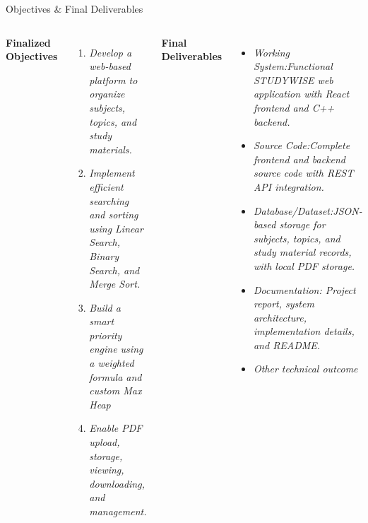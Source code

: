 \documentclass[aspectratio=169,11pt]{beamer}
\newcommand{\placeholder}[1]{%
\textit{\color{GEUGrey}#1}
}
\begin{document}
\vspace{-2cm}
\begin{frame}{Objectives \& Final Deliverables}

\begin{columns}[T,totalwidth=\textwidth]

\vspace{-0.8cm}
\textbf{\color{GEUBlue}Finalized Objectives}

\begin{enumerate}\itemsep3pt
    \item \placeholder{Develop a web-based platform to organize subjects, topics, and study materials.}
    \item \placeholder{Implement efficient searching and sorting using Linear Search, Binary Search, and Merge Sort.}
    \item \placeholder{Build a smart priority engine using a weighted formula and custom Max Heap}
    \item \placeholder{Enable PDF upload, storage, viewing, downloading, and management.}
\end{enumerate}

\vspace{-0.8cm}
\textbf{\color{GEUBlue}Final Deliverables}

\begin{itemize}\itemsep3pt
    \item \placeholder{Working System:Functional STUDYWISE web application with React frontend and C++ backend.}
    \item \placeholder{Source Code:Complete frontend and backend source code with REST API integration.}
    \item \placeholder{Database/Dataset:JSON-based storage for subjects, topics, and study material records, with local PDF storage.}
    \item \placeholder{Documentation: Project report, system architecture, implementation details, and README.}
    \item \placeholder{Other technical outcome}
\end{itemize}

\end{columns}

\vfill
\end{frame}
\end{document}
